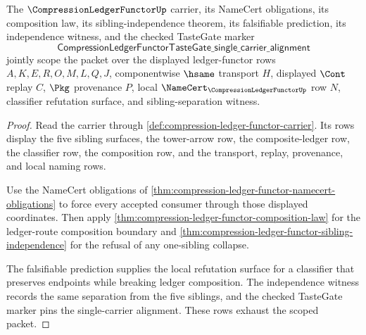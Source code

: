 
\begin{theorem}
\label{thm:compression-ledger-functor-scoped-route}
The $\CompressionLedgerFunctorUp$ carrier, its NameCert obligations, its composition law, its sibling-independence theorem, its falsifiable prediction, its independence witness, and the checked TasteGate marker
$$
\mathsf{CompressionLedgerFunctorTasteGate\_single\_carrier\_alignment}
$$
jointly scope the packet over the displayed ledger-functor rows $A,K,E,R,O,M,L,Q,J$, componentwise $\hsame$ transport $H$, displayed $\Cont$ replay $C$, $\Pkg$ provenance $P$, local $\NameCert_{\CompressionLedgerFunctorUp}$ row $N$, classifier refutation surface, and sibling-separation witness.
\end{theorem}
\begin{proof}
Read the carrier through \autoref{def:compression-ledger-functor-carrier}. Its rows display the five sibling surfaces, the tower-arrow row, the composite-ledger row, the classifier row, the composition row, and the transport, replay, provenance, and local naming rows.

Use the NameCert obligations of \autoref{thm:compression-ledger-functor-namecert-obligations} to force every accepted consumer through those displayed coordinates. Then apply \autoref{thm:compression-ledger-functor-composition-law} for the ledger-route composition boundary and \autoref{thm:compression-ledger-functor-sibling-independence} for the refusal of any one-sibling collapse.

The falsifiable prediction supplies the local refutation surface for a classifier that preserves endpoints while breaking ledger composition. The independence witness records the same separation from the five siblings, and the checked TasteGate marker pins the single-carrier alignment. These rows exhaust the scoped packet.
\end{proof}


